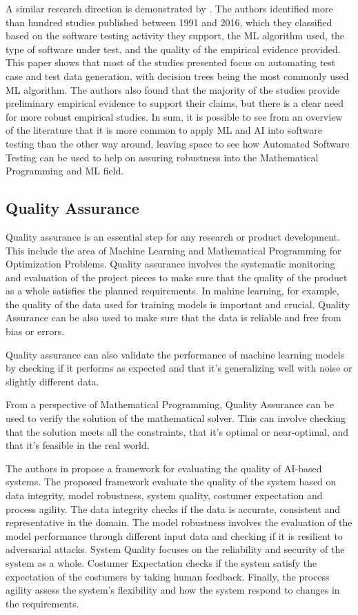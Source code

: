 \documentclass{article}
\begin{document}
A similar research direction is demonstrated by \cite{durelli2019machine}. The authors identified more than hundred studies published between 1991 and 2016, which they classified based on the software testing activity they support, the ML algorithm used, the type of software under test, and the quality of the empirical evidence provided. This paper shows that most of the studies presented focus on automating test case and test data generation, with decision trees being the most commonly used ML algorithm. The authors also found that the majority of the studies provide preliminary empirical evidence to support their claims, but there is a clear need for more robust empirical studies.
In sum, it is possible to see from an overview of the literature that it is more common to apply ML and AI into software testing than the other way around, leaving space to see how Automated Software Testing can be used to help on assuring robustness into the Mathematical Programming and ML field.


\subsection{Quality Assurance}

Quality assurance is an essential step for any research or product development. This include the area of Machine Learning and Mathematical Programming for Optimization Problems. Quality assurance involves the systematic monitoring and evaluation of  the project pieces to make sure that the quality of the product as a whole satisfies the planned requirements. In mahine learning, for example, the quality of the data used for training models is important and crucial. Quality Assurance can be also used to make sure that the data is reliable and free from bias or errors. 

Quality assurance can also validate the performance of machine learning models by checking if it performs as expected and that it's generalizing well with noise or slightly different data.  

From a perspective of Mathematical Programming, Quality Assurance can be used to verify the solution of the mathematical solver. This can involve checking that the solution meets all the constraints, that it's optimal or near-optimal, and that it's feasible in the real world. 

The authors in \cite{fujii2020guidelines} propose a framework for evaluating the quality of AI-based systems. The proposed framework evaluate the quality of the system based on data integrity, model robustness, system quality, costumer expectation and process agility. The data integrity checks if the data is accurate, consistent and representative in the domain. The model robustness involves the evaluation of the model performance through different input data and checking if it is resilient to adversarial attacks. System Quality focuses on the reliability and security of the system as a whole. Costumer Expectation checks if the system satisfy the expectation of the costumers by taking human feedback. Finally, the process agility assess the system’s flexibility and how the system respond to changes in the requirements.
\end{document}
